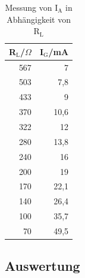\documentclass[12pt,a4paper]{article}
\begin{document}
\begin{table}[H]
\caption{Messung von I$_\text{A}$ in Abhängigkeit von R$_\text{L}$}
\begin{center}
\begin{tabular}{|r|r|}
\hline
R$_\text{L}$/$\Omega$ & I$_\text{G}$/mA \\ \hline
567 & 7 \\ \hline
503 & 7,8 \\ \hline
433 & 9 \\ \hline
370 & 10,6 \\ \hline
322 & 12 \\ \hline
280 & 13,8 \\ \hline
240 & 16 \\ \hline
200 & 19 \\ \hline
170 & 22,1 \\ \hline
140 & 26,4 \\ \hline
100 & 35,7 \\ \hline
70 & 49,5 \\ \hline
\end{tabular}
\end{center}
\label{tab:a_5_i}
\end{table}



\subsection{Auswertung}
\end{document}
